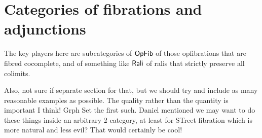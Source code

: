 \documentclass{amsart}
\begin{document}
\begin{comment}
Thoughts about these assumptions. Here are the desired examples I can think of now: $ \ca{Set} $ together with $ \ca{Graph} $ or $ \ca{Top} $. The enriched over sets and completeness are both there. So is essential surjectivity. And reflection of isomorphisms.  The continuity is definitely needed, since it's necessary if $ R $ is a right adjoint. 

Go back to the right adjoint we had in the ``converse'' to the above theorem.  That is, we have a coreflection $ \L \dashv R \from \ca{C} \leftrightarrow \ca{D} $ where $ \L $ is left exact.  Of course this gives the continuity of $ R $. Essential surjectivity follows from Gabriel-Zisman. Is it a Street opfibration? $ \L $ is conservative, but is $ R $?

\begin{ex}
  No, $ R $ is not in general conservative.
  Consider the underlying node functor
  $ \Grph \to \Set $.  All $ \Grph $-endomorphisms
  on
  \[
    \begin{tikzpicture}
      \node (a) at (0,0) {$ \bullet $};
      \node (b) at (2,0) {$ \bullet $};
      \draw [->] (a.30) to (b.150);
      \draw [->] (a.-30) to (b.-150);
    \end{tikzpicture}
  \]
  are sent to the identity on $ 2 $.
\end{ex}
\end{comment}

\section{Categories of fibrations and adjunctions}

The key players here are subcategories of $\mathsf{OpFib}$ of those opfibrations that are fibred cocomplete, and of something like
$\mathsf{Rali}$ of ralis that strictly preserve all colimits.

{\chris Also, not sure if separate section for that, but we should try and include as many reasonable examples as possible. The quality rather
than the quantity is important I think! Grph Set the first such.}
{\chris Daniel mentioned we may want to do these things inside an arbitrary 2-category, at least for STreet fibration which is more natural and less evil? That would certainly be cool!}



\end{document}
